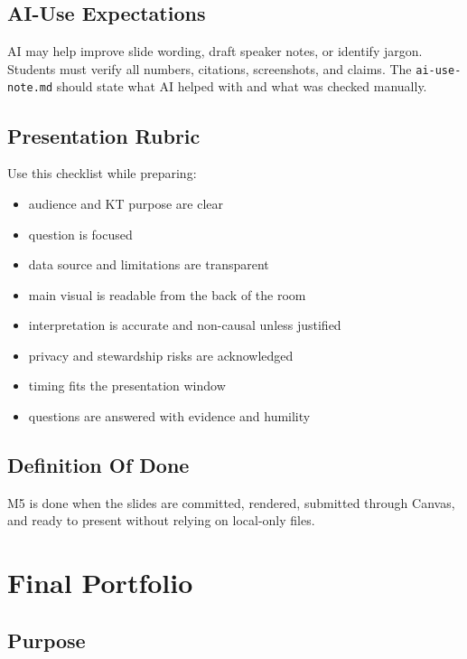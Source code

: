 \documentclass[
  letterpaper,
  DIV=11,
  numbers=noendperiod,
  oneside]{scrreprt}
\providecommand{\tightlist}{%
  \setlength{\itemsep}{0pt}\setlength{\parskip}{0pt}}
\begin{document}
\section{AI-Use Expectations}\label{ai-use-expectations-6}

AI may help improve slide wording, draft speaker notes, or identify
jargon. Students must verify all numbers, citations, screenshots, and
claims. The \texttt{ai-use-note.md} should state what AI helped with and
what was checked manually.

\section{Presentation Rubric}\label{presentation-rubric}

Use this checklist while preparing:

\begin{itemize}
\tightlist
\item
  audience and KT purpose are clear
\item
  question is focused
\item
  data source and limitations are transparent
\item
  main visual is readable from the back of the room
\item
  interpretation is accurate and non-causal unless justified
\item
  privacy and stewardship risks are acknowledged
\item
  timing fits the presentation window
\item
  questions are answered with evidence and humility
\end{itemize}

\section{Definition Of Done}\label{definition-of-done-8}

M5 is done when the slides are committed, rendered, submitted through
Canvas, and ready to present without relying on local-only files.

\chapter{Final Portfolio}\label{final-portfolio-1}

\section{Purpose}\label{purpose-7}
\end{document}
